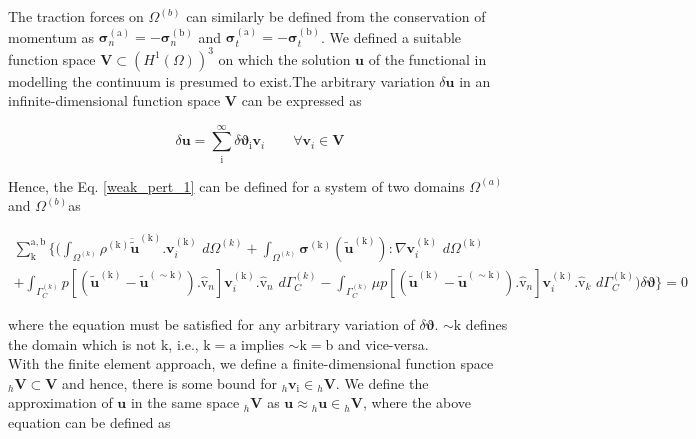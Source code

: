 The traction forces on $\Omega^{(b)}$ can similarly be defined from the conservation of momentum as $\bm{\sigma}^{\mathrm{(a)}}_n = - \bm{\sigma}^{\mathrm{(b)}}_n$ and $\bm{\sigma}^{\mathrm{(a)}}_t = - \bm{\sigma}^{\mathrm{(b)}}_t$. 
We defined a suitable function space $\bm V \subset (H^1(\Omega))^3$ on which the solution $\bm u$ of the functional in modelling the continuum is presumed to exist.The arbitrary variation $\delta \bm u$ in an infinite-dimensional function space $\bm V$ can be expressed as

\begin{equation}
\delta \bm u = \sum^{\infty}_\mathrm{i}  \delta \bm \vartheta_\mathrm{i} \bm v_i \qquad \forall  \bm v_i \in \bm V
\end{equation}

Hence, the Eq. \eqref{weak_pert_1} can be defined for a system of two domains $\Omega^{(a)}$ and $\Omega^{(b)}$as 


\begin{multline} \label{weak_pert_2}
\sum^{\mathrm{a,b}}_{\mathrm{k}}    \bigg\{   \bigg( \int_{\Omega^{(k)}}\rho^\mathrm{(k)}\bm{\ddot{\widetilde{u}}}^\mathrm{(k)}.  \bm v_i^\mathrm{(k)} \,\,d \Omega^{(k)}+\int_{\Omega^{(k)}} \bm{\sigma}^\mathrm{(k)}(\bm{\widetilde u}^\mathrm{(k)}) : \nabla \bm v_i^\mathrm{(k)}\,\,d \Omega^{(\mathrm k)}\\  
+\int_{\Gamma^{(k)}_C}  \mathit{p}[({\widetilde{\bm u}}^{(\mathrm k)} - {\widetilde{\bm u}}^{( \sim \mathrm k)}). \bm{\hat{\mathrm v}}_n]  \bm v_i^\mathrm{(k)}. \bm{\hat{\mathrm v}}_n \,\,d{\Gamma^{(k)}_C} 
-\int_{\Gamma^{(k)}_C}  \mu \mathit{p}[({\widetilde{\bm u}}^{(\mathrm k)} - {\widetilde{\bm u}}^{(\sim \mathrm k)}). \bm{\hat{\mathrm v}}_n]  \bm v_i^\mathrm{(k)}. \bm{\hat{\mathrm v}}_k \,\,d{\Gamma^{(\mathrm k)}_C} \bigg) \delta \bm \vartheta  \bigg\} = 0 
\end{multline} 

where the equation must be satisfied for any arbitrary variation of $\delta \bm \vartheta$. $\sim \mathrm k$ defines the domain which is not $\mathrm k$, i.e., $\mathrm{k=a}$ implies $\sim\mathrm{k=b}$ and vice-versa.\\

With the finite element approach, we define a finite-dimensional function space ${}_h \bm {V} \subset \bm V$ and hence, there is some bound for ${}_h \bm v_\mathrm{i} \in {}_h \bm V$. We define the approximation of $\bm u$ in the same space ${}_h \bm V$ as $\bm u \approx {}_h \bm u \in {}_h \bm V$, where the above equation can be defined as

